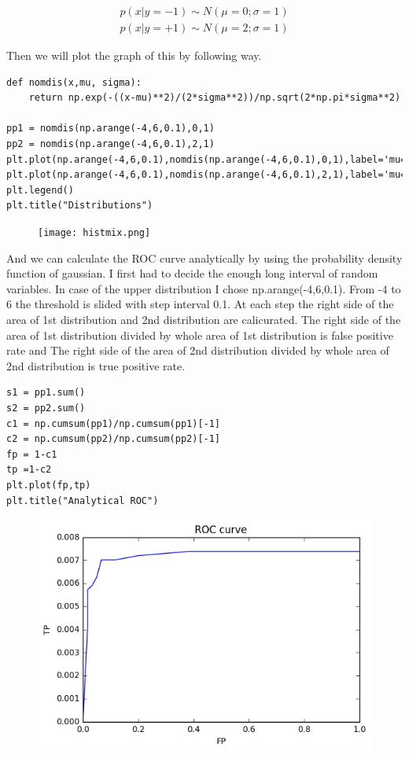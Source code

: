 \documentclass[a4paper,11pt]{article}
\begin{document}
\begin{eqnarray*}
p(x|y = -1) \sim N(\mu = 0; \sigma = 1) \\
p(x|y = +1) \sim N(\mu = 2; \sigma = 1)
\end{eqnarray*}

Then we will plot the graph of this by following way.

\begin{verbatim}
def nomdis(x,mu, sigma):
    return np.exp(-((x-mu)**2)/(2*sigma**2))/np.sqrt(2*np.pi*sigma**2)
    
pp1 = nomdis(np.arange(-4,6,0.1),0,1)
pp2 = nomdis(np.arange(-4,6,0.1),2,1)
plt.plot(np.arange(-4,6,0.1),nomdis(np.arange(-4,6,0.1),0,1),label='mu=0,std=1')
plt.plot(np.arange(-4,6,0.1),nomdis(np.arange(-4,6,0.1),2,1),label='mu=2,std=1')
plt.legend()
plt.title("Distributions")
\end{verbatim}

\begin{figure}[htbp]
  \texttt{[image: histmix.png]}
\end{figure}

And we can calculate the ROC curve analytically by using the probability density function of gaussian. I first had to decide the enough long interval of random variables. In case of the upper distribution I chose np.arange(-4,6,0.1). From -4 to 6 the threshold is slided with step interval 0.1. At each step the right side of the area of 1st distribution and 2nd distribution are calicurated. The right side of the area of 1st distribution divided by whole area of 1st distribution is false positive rate and The right side of the area of 2nd distribution divided by whole area of 2nd distribution is true positive rate.

\begin{verbatim}
s1 = pp1.sum()
s2 = pp2.sum()
c1 = np.cumsum(pp1)/np.cumsum(pp1)[-1]
c2 = np.cumsum(pp2)/np.cumsum(pp2)[-1]
fp = 1-c1
tp =1-c2
plt.plot(fp,tp)
plt.title("Analytical ROC")
\end{verbatim}

\begin{figure}[htbp]
  \includegraphics[scale=0.7]{roc.png}
\end{figure}
\end{document}
